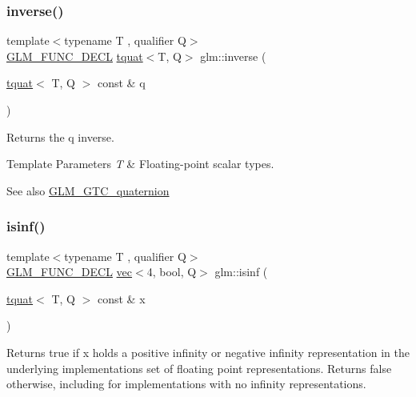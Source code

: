 \subsubsection{\texorpdfstring{inverse()}{inverse()}}
{\footnotesize\ttfamily template$<$typename T , qualifier Q$>$ \\
\mbox{\hyperlink{setup_8hpp_ab2d052de21a70539923e9bcbf6e83a51}{G\+L\+M\+\_\+\+F\+U\+N\+C\+\_\+\+D\+E\+CL}} \mbox{\hyperlink{structglm_1_1tquat}{tquat}}$<$T, Q$>$ glm\+::inverse (\begin{DoxyParamCaption}\item[{\mbox{\hyperlink{structglm_1_1tquat}{tquat}}$<$ T, Q $>$ const \&}]{q }\end{DoxyParamCaption})}

Returns the q inverse.


\begin{DoxyTemplParams}{Template Parameters}
{\em T} & Floating-\/point scalar types.\\
\hline
\end{DoxyTemplParams}
\begin{DoxySeeAlso}{See also}
\mbox{\hyperlink{group__gtc__quaternion}{G\+L\+M\+\_\+\+G\+T\+C\+\_\+quaternion}} 
\end{DoxySeeAlso}
\mbox{\label{group__gtc__quaternion_ga139abc0f7f89553e341f8be95bf8d3cb}} 
\subsubsection{\texorpdfstring{isinf()}{isinf()}}
{\footnotesize\ttfamily template$<$typename T , qualifier Q$>$ \\
\mbox{\hyperlink{setup_8hpp_ab2d052de21a70539923e9bcbf6e83a51}{G\+L\+M\+\_\+\+F\+U\+N\+C\+\_\+\+D\+E\+CL}} \mbox{\hyperlink{structglm_1_1vec}{vec}}$<$4, bool, Q$>$ glm\+::isinf (\begin{DoxyParamCaption}\item[{\mbox{\hyperlink{structglm_1_1tquat}{tquat}}$<$ T, Q $>$ const \&}]{x }\end{DoxyParamCaption})}

Returns true if x holds a positive infinity or negative infinity representation in the underlying implementation\textquotesingle{}s set of floating point representations. Returns false otherwise, including for implementations with no infinity representations.


